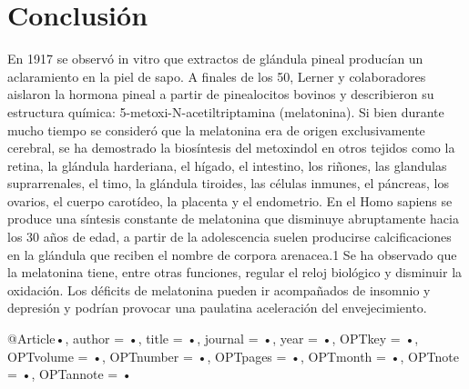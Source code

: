 \documentclass[a4paper,twocolumn,10pt]{article}
\begin{document}
\section{Conclusión}
En 1917 se observó in vitro que extractos de glándula pineal producían un aclaramiento en la piel de sapo. A finales de los 50, Lerner y colaboradores aislaron la hormona pineal a partir de pinealocitos bovinos y describieron su estructura química: 5-metoxi-N-acetiltriptamina (melatonina). Si bien durante mucho tiempo se consideró que la melatonina era de origen exclusivamente cerebral, se ha demostrado la biosíntesis del metoxindol en otros tejidos como la retina, la glándula harderiana, el hígado, el intestino, los riñones, las glandulas suprarrenales, el timo, la glándula tiroides, las células inmunes, el páncreas, los ovarios, el cuerpo carotídeo, la placenta y el endometrio.
En el Homo sapiens se produce una síntesis constante de melatonina que disminuye abruptamente hacia los 30 años de edad, a partir de la adolescencia suelen producirse calcificaciones en la glándula que reciben el nombre de corpora arenacea.1​ Se ha observado que la melatonina tiene, entre otras funciones, regular el reloj biológico y disminuir la oxidación. Los déficits de melatonina pueden ir acompañados de insomnio y depresión y podrían provocar una paulatina aceleración del envejecimiento.

@Article{•,
author = {•},
title = {•},
journal = {•},
year = {•},
OPTkey = {•},
OPTvolume = {•},
OPTnumber = {•},
OPTpages = {•},
OPTmonth = {•},
OPTnote = {•},
OPTannote = {•}
}
\end{document}
